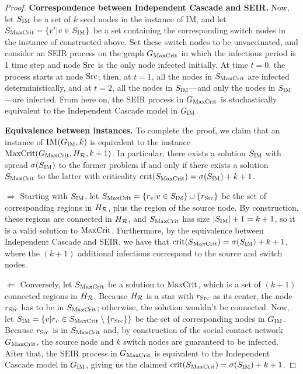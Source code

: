 \begin{proof}
\noindent
\textbf{Correspondence between Independent Cascade and SEIR.} Now, let $S_{\textsc{IM}}{}$ be a set of $k$ seed nodes in the instance of IM, and let $S_{\text{MaxCrit}}{}= \{v' | v \in S_{\textsc{IM}}{}\}$ be a set containing the corresponding switch nodes in the instance of \maxcrit{} constructed above. Set these switch nodes to be unvaccinated, and consider an SEIR process on the graph $G_{\text{MaxCrit}}{}$ in which the infectious period is 1 time step and node $\text{Src}$ is the only node infected initially. At time $t=0$, the process starts at node $\text{Src}$; then, at $t=1$, all the nodes in $S_{\text{MaxCrit}}{}$ are infected deterministically, and at $t=2$, all the nodes in $S_{\textsc{IM}}{}$---and only the nodes in $S_{\textsc{IM}}{}$---are infected. From here on, the SEIR process in $G_{\text{MaxCrit}}{}$ is stochastically equivalent to the Independent Cascade model in $G_{\textsc{IM}}{}$. 

\noindent
\textbf{Equivalence between instances.} To complete the proof, we claim that an instance of $\textsc{IM}{}(G_{\textsc{IM}}{}, k)$ is equivalent to the instance $\text{MaxCrit}{}(G_{\text{MaxCrit}}{}, H_{\mathcal{R}}, k + 1)$.
In particular, there exists a solution $S_{\textsc{IM}}{}$ with spread $\sigma(S_{\textsc{IM}}{})$ to the former problem if and only if there exists a solution $S_{\text{MaxCrit}}{}$ to the latter with criticality $\text{crit}(S_{\text{MaxCrit}}{}) = \sigma(S_{\textsc{IM}}{}) + k + 1$. 

$\Rightarrow$ Starting with $S_{\textsc{IM}}{}$, let $S_{\text{MaxCrit}}{}= \{r_v | v \in S_{\textsc{IM}}{}\} \cup \{r_{\text{Src}}\}$ be the set of corresponding regions in $H_{\mathcal{R}}$, plus the region of the source node. By construction, these regions are connected in $H_{\mathcal{R}}$, and $S_{\text{MaxCrit}}{}$ has size $|S_{\textsc{IM}}{}| + 1 = k + 1$, so it is a valid solution to $\text{MaxCrit}$. Furthermore, by the equivalence between Independent Cascade and SEIR, we have that $\text{crit}(S_{\text{MaxCrit}}{}) = \sigma(S_{\textsc{IM}}{}) + k + 1$, where the $(k + 1)$ additional infections correspond to the source and switch nodes.

$\Leftarrow$ Conversely, let $S_{\text{MaxCrit}}{}$ be a solution to $\text{MaxCrit}{}$, which is a set of $(k+1)$ connected regions in $H_{\mathcal{R}}$. Because $H_{\mathcal{R}}$ is a star with $r_{\text{Src}}$ as its center, the node $r_{\text{Src}}$ has to be in $S_{\text{MaxCrit}}{}$; otherwise, the solution wouldn't be connected. Now, let $S_{\textsc{IM}}{}= \{v | r_v \in S_{\text{MaxCrit}}{} \setminus \{r_{\text{Src}}\}\}$ be the set of corresponding nodes in $G_{\textsc{IM}}{}$. Because $r_{\text{Src}}$ is in $S_{\text{MaxCrit}}$ and, by construction of the social contact network $G_{\text{MaxCrit}}{}$, the source node and $k$ switch nodes are guaranteed to be infected. After that, the SEIR process in $G_{\text{MaxCrit}}{}$ is equivalent to the Independent Cascade model in $G_{\textsc{IM}}{}$, giving us the claimed $\text{crit}(S_{\text{MaxCrit}}{}) = \sigma(S_{\textsc{IM}}{}) + k + 1$.

\end{proof}

